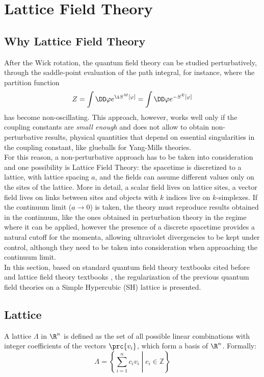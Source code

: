 \section{Lattice Field Theory}
\subsection{Why Lattice Field Theory}
After the Wick rotation, the quantum field theory can be studied perturbatively, through the saddle-point evaluation of the path integral, for instance, where the partition function
\begin{equation*}
    Z = \int\DD\varphi e^{\i S^M[\varphi]} = \int\DD\varphi e^{-S^E[\varphi]}
\end{equation*}
has become non-oscillating.
This approach, however, works well only if the coupling constants are \emph{small enough} and does not allow to obtain non-perturbative results, \ie physical quantities that depend on essential singularities in the coupling constant, like glueballs for Yang-Mills theories.\\
For this reason, a non-perturbative approach has to be taken into consideration and one possibility is Lattice Field Theory: the spacetime is discretized to a lattice, with lattice spacing $a$, and the fields can assume different values only on the sites of the lattice.
More in detail, a scalar field lives on lattice sites, a vector field lives on links between sites and objects with $k$ indices live on $k$-simplexes.
If the continuum limit ($a\to0$) is taken, the theory must reproduce results obtained in the continuum, like the ones obtained in perturbation theory in the regime where it can be applied, however the presence of a discrete spacetime provides a natural cutoff for the momenta, allowing ultraviolet divergencies to be kept under control, although they need to be taken into consideration when approaching the continuum limit.\\
In this section, based on standard quantum field theory textbooks cited before and lattice field theory textbooks \cite{Montvay:1994cy, Gattringer:2010zz, DeGrand:2006zz}, the regularization of the previous quantum field theories on a Simple Hypercubic (SH) lattice is presented.
\subsection{Lattice}
A lattice $\Lambda$ in $\R^n$ is defined as the set of all possible linear combinations with integer coefficients of the vectors $\prc{v_i}$, which form a basis of $\R^n$.
Formally:
\begin{equation}
    \Lambda =\left\{\left.\sum _{i=1}^{n}c_{i}v_{i}\;\right\vert \;c_{i}\in \mathbb {Z} \right\} \label{1:genericLattice}
\end{equation}


